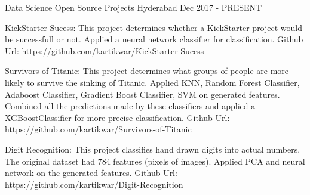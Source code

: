 \begin{cventries}


  \cventry
    {Data Science} %
    {Open Source Projects} %
    {Hyderabad} %
    {Dec 2017 - PRESENT} %
    {
      \begin{cvitems} %
        \item {KickStarter-Sucess: This project determines whether a KickStarter project would be successfull or not. Applied a neural network classifier for classification. Github Url: https://github.com/kartikwar/KickStarter-Sucess} 
        \item {Survivors of Titanic: This project determines what groups of people are more likely to survive the sinking of Titanic. Applied KNN, Random Forest Classifier, Adaboost Classifier, Gradient Boost Classifier, SVM on generated features. Combined all the predictions made by these classifiers and applied a XGBoostClassifier for more precise classification. Github Url: https://github.com/kartikwar/Survivors-of-Titanic} 
        \item {Digit Recognition:  This project classifies hand drawn digits into actual numbers. The original dataset had 784 features (pixels of images). Applied PCA and neural network on the generated features. Github Url: https://github.com/kartikwar/Digit-Recognition}      
	\end{cvitems}
    }
\end{cventries}
